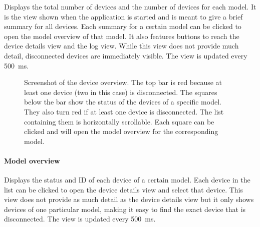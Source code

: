 Displays the total number of devices and the number of devices for each model. It is the view shown
when the application is started and is meant to give a brief summary for all devices. Each summary
for a certain model can be clicked to open the model overview of that model. It also features buttons
to reach the device details view and the log view. While this view does not provide much detail,
disconnected devices are immediately visible. The view is updated every \SI{500}{\milli\second}.

\begin{figure}[H]
    \centering
    \setlength{\fboxsep}{0mm}
    \caption[Screenshot of the device overview]{
        Screenshot of the device overview. The top bar is red because at least one device (two in
        this case) is disconnected. The squares below the bar show the status of the devices of a
        specific model. They also turn red if at least one device is disconnected. The list containing
        them is horizontally scrollable. Each square can be clicked and will open the model overview
        for the corresponding model.
    }
\end{figure}

\paragraph{Model overview}

Displays the status and ID of each device of a certain model. Each device in the list can be clicked
to open the device details view and select that device. This view does not provide as much detail as
the device details view but it only shows devices of one particular model, making it easy to find
the exact device that is disconnected. The view is updated every \SI{500}{\milli\second}.

